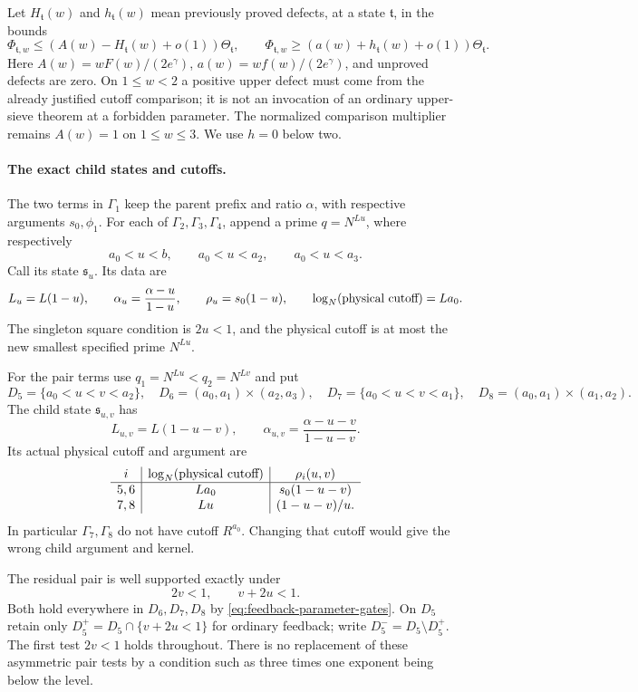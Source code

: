 \documentclass[11pt]{article}
\begin{document}
Let $H_{\mathfrak t}(w)$ and $h_{\mathfrak t}(w)$ mean previously
proved defects, at a state $\mathfrak t$, in the bounds
\[
 \Phi_{\mathfrak t,w}\le
 (A(w)-H_{\mathfrak t}(w)+o(1))\Theta_{\mathfrak t},\qquad
 \Phi_{\mathfrak t,w}\ge
 (a(w)+h_{\mathfrak t}(w)+o(1))\Theta_{\mathfrak t}.
\]
Here $A(w)=wF(w)/(2e^\gamma)$, $a(w)=wf(w)/(2e^\gamma)$,
and unproved defects are zero.  On $1\le w<2$ a positive upper
defect must come from the already justified cutoff comparison;
it is not an invocation of an ordinary upper-sieve theorem at a
forbidden parameter.  The normalized comparison multiplier remains
$A(w)=1$ on $1\le w\le3$.  We use $h=0$ below two.

\paragraph{The exact child states and cutoffs.}
The two terms in $\Gamma_1$ keep the parent prefix and ratio
$\alpha$, with respective arguments $s_0,\phi_1$.
For each of $\Gamma_2,\Gamma_3,\Gamma_4$, append a prime
$q=N^{Lu}$, where respectively
\[
 a_0<u<b,\qquad a_0<u<a_2,\qquad a_0<u<a_3.
\]
Call its state $\mathfrak s_u$.  Its data are
\begin{equation}\label{eq:feedback-single-child}
 L_u=L(1-u),\qquad
 \alpha_u=\frac{\alpha-u}{1-u},\qquad
 \rho_u=s_0(1-u),\qquad
 \log_N(\hbox{physical cutoff})=La_0.
\end{equation}
The singleton square condition is $2u<1$, and the physical cutoff
is at most the new smallest specified prime $N^{Lu}$.

For the pair terms use $q_1=N^{Lu}<q_2=N^{Lv}$ and put
\[
 D_5=\{a_0<u<v<a_2\},\quad
 D_6=(a_0,a_1)\times(a_2,a_3),\quad
 D_7=\{a_0<u<v<a_1\},\quad
 D_8=(a_0,a_1)\times(a_1,a_2).
\]
The child state $\mathfrak s_{u,v}$ has
\begin{equation}\label{eq:feedback-pair-child}
 L_{u,v}=L(1-u-v),\qquad
 \alpha_{u,v}=\frac{\alpha-u-v}{1-u-v}.
\end{equation}
Its actual physical cutoff and argument are
\[
\begin{array}{c|c|c}
 i&\log_N(\hbox{physical cutoff})&\rho_i(u,v)\\\hline
 5,6&La_0&s_0(1-u-v)\\
 7,8&Lu&(1-u-v)/u.
\end{array}
\]
In particular $\Gamma_7,\Gamma_8$ do not have cutoff $R^{a_0}$.
Changing that cutoff would give the wrong child argument and kernel.

The residual pair is well supported exactly under
\begin{equation}\label{eq:feedback-pair-squares}
 2v<1,\qquad v+2u<1.
\end{equation}
Both hold everywhere in $D_6,D_7,D_8$ by
\eqref{eq:feedback-parameter-gates}.  On $D_5$ retain only
$D_5^+=D_5\cap\{v+2u<1\}$ for ordinary feedback; write
$D_5^-=D_5\setminus D_5^+$.  The first test $2v<1$ holds throughout.
There is no replacement of these asymmetric pair tests by a
condition such as three times one exponent being below the level.
\end{document}

